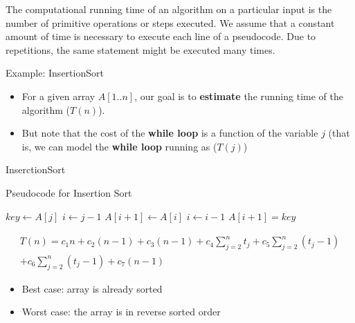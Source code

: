 \documentclass{beamer}
\begin{document}
\begin{frame}
  The computational running time of an algorithm on a particular input is the
  number of primitive operations or steps executed. \pause We
  assume that a constant amount of time is necessary to
  execute each line of a pseudocode. \pause Due to repetitions, the
  same statement might be executed many times. 

  \begin{block}{Example: InsertionSort}
    \begin{itemize}
    \item For a given array $A[1..n]$, our goal is to
      {\bf estimate} the running time of the algorithm ($T(n)$).

    \item But note that the cost of the {\bf while loop} is
      a function of the variable $j$ (that is, we can
      model the {\bf while loop} running as ($T(j)$)
    \end{itemize}
  \end{block}
\end{frame}



\begin{frame}{InserctionSort}

  \begin{block}{Pseudocode for Insertion Sort}
\begin{scriptsize}
    \begin{algorithmic}
                    
         \State $key \gets A[j]$                  
         \State $i \gets j-1$                     
                  
            \State $A[i+1] \gets A[i]$            
            \State $i \gets i - 1$                
         \EndWhile
         \State $A[i+1] = key$                    
       \EndFor
    \EndProcedure
    \end{algorithmic}
  \end{scriptsize}  
  \end{block}
\end{frame} 

\begin{frame}
  \begin{multline*}
    T(n)  =  c_1n + c_2(n-1) + c_3(n-1) + c_4\sum_{j=2}^{n}t_j + c_5\sum_{j=2}^{n}(t_j - 1) \\ + c_6\sum_{j=2}^{n}(t_j - 1) + c_7(n-1)
  \end{multline*}
\pause
  \begin{itemize}
   \item Best case: array is already sorted
   \item Worst case: the array is in reverse sorted order 
  \end{itemize}
  
\end{frame}
\end{document}
